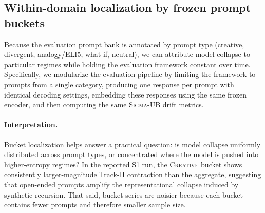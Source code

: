 \documentclass{article}
\theoremstyle{plain}
\theoremstyle{definition}
\theoremstyle{remark}
\newcommand{\sgma}{\textsc{Sigma}\xspace}
\begin{document}
\subsection{Within-domain localization by frozen prompt buckets }
\label{app:bucket_localization}

Because the evaluation prompt bank is annotated by prompt type (creative, divergent, analogy/ELI5, what-if, neutral), we can attribute model collapse to particular regimes while holding the evaluation framework constant over time. Specifically, we modularize the evaluation pipeline by limiting the framework to prompts from a single category, producing one response per prompt with identical decoding settings, embedding these responses using the same frozen encoder, and then computing the same \sgma-UB drift metrics.

\paragraph{Interpretation.}
Bucket localization helps answer a practical question: is model collapse uniformly distributed across prompt types, or concentrated where the model is pushed into higher-entropy regimes? In the reported S1 run, the \textsc{Creative} bucket shows consistently larger-magnitude Track-II contraction than the aggregate, suggesting that open-ended prompts amplify the representational collapse induced by synthetic recursion. That said, bucket series are noisier because each bucket contains fewer prompts and therefore smaller sample size.
\end{document}
